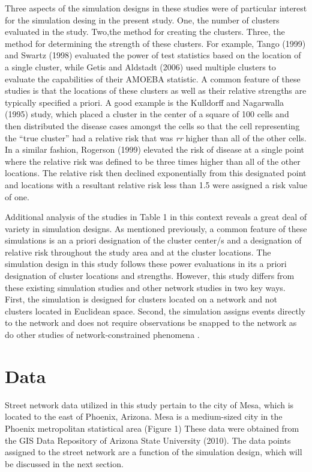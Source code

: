 \documentclass[12pt, letterpaper]{article}
\begin{document}
Three aspects of the simulation designs in these studies were of particular interest for the simulation desing in the present study. One, the number of clusters evaluated in the study. Two,the method for creating the clusters. Three, the method for determining the strength of these clusters.  For example, Tango (1999) and Swartz (1998) evaluated the power of test statistics based on the location of a single cluster, while Getis and Aldstadt (2006) used multiple clusters to evaluate the capabilities of their AMOEBA statistic. A common feature of these studies is that the locations of these clusters as well as their relative strengths are typically specified a priori. A good example is the Kulldorff and Nagarwalla (1995) study, which placed a cluster in the center of a square of 100 cells and then distributed the disease cases amongst the cells so that the cell representing the ``true cluster'' had a relative risk that was \emph{rr} higher than all of the other cells. In a similar fashion, Rogerson (1999) elevated the risk of disease at a single point where the relative risk was defined to be three times higher than all of the other locations. The relative risk then declined exponentially from this designated point and locations with a resultant relative risk less than 1.5 were assigned a risk value of one.   

Additional analysis of the studies in Table 1 in this context reveals a great deal of variety in simulation designs. As mentioned previously, a common feature of these simulations is an a priori designation of the cluster center/s and a designation of relative risk throughout the study area and at the cluster locations. The simulation design in this study follows these power evaluations in its a priori designation of cluster locations and strengths. However, this study differs from these existing simulation studies and other network studies in two key ways. First, the simulation is designed for clusters located on a network and not clusters located in Euclidean space. Second, the simulation assigns events directly to the network and does not require observations be snapped to the network as do other studies of network-constrained phenomena \citep{borruso2008network, xie2008kernel, okabe2009kernel}.


\section{Data} 
Street network data utilized in this study pertain to the city of Mesa, which is located to the east of Phoenix, Arizona. Mesa is a medium-sized city in the Phoenix metropolitan statistical area (Figure 1) %
These data were obtained from the GIS Data Repository of Arizona State University (2010). The data points assigned to the street network are a function of the simulation design, which will be discussed in the next section.
\end{document}
